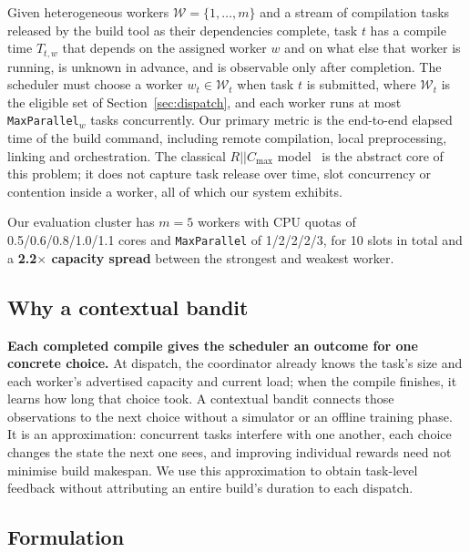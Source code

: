 \documentclass[final,5p,times,twocolumn]{elsarticle}
\begin{document}
Given heterogeneous workers $\mathcal{W}=\{1,\dots,m\}$ and a stream of compilation tasks released by the build tool as their dependencies complete, task $t$ has a compile time $T_{t,w}$ that depends on the assigned worker $w$ and on what else that worker is running, is unknown in advance, and is observable only after completion. The scheduler must choose a worker $w_t\in\mathcal{W}_t$ when task $t$ is submitted, where $\mathcal{W}_t$ is the eligible set of Section~\ref{sec:dispatch}, and each worker runs at most \texttt{MaxParallel}$_w$ tasks concurrently. Our primary metric is the end-to-end elapsed time of the build command, including remote compilation, local preprocessing, linking and orchestration. The classical $R||C_{\max}$ model~\cite{lenstra1990} is the abstract core of this problem; it does not capture task release over time, slot concurrency or contention inside a worker, all of which our system exhibits.

Our evaluation cluster has $m=5$ workers with CPU quotas of 0.5/0.6/0.8/1.0/1.1 cores and \texttt{MaxParallel} of 1/2/2/2/3, for 10 slots in total and a \textbf{2.2$\times$ capacity spread} between the strongest and weakest worker.

\subsection{Why a contextual bandit}

\textbf{Each completed compile gives the scheduler an outcome for one concrete choice.} At dispatch, the coordinator already knows the task's size and each worker's advertised capacity and current load; when the compile finishes, it learns how long that choice took. A contextual bandit connects those observations to the next choice without a simulator or an offline training phase. It is an approximation: concurrent tasks interfere with one another, each choice changes the state the next one sees, and improving individual rewards need not minimise build makespan. We use this approximation to obtain task-level feedback without attributing an entire build's duration to each dispatch.

\subsection{Formulation}
\label{sec:reward}
\end{document}
